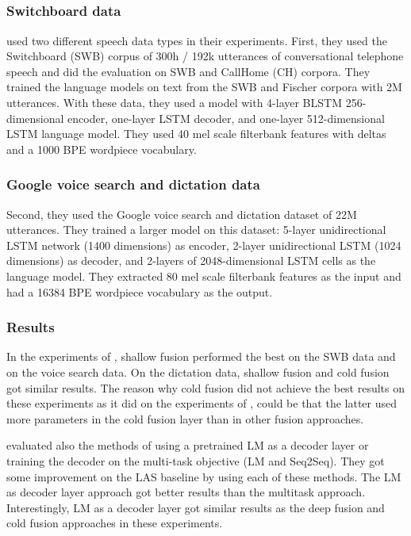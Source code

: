 \documentclass[11pt]{article}
\begin{document}
\subsection{\citet{toshniwal2018comparison}}
\subsubsection{Switchboard data}
\citet{toshniwal2018comparison} used two different speech data types in their experiments. First, they used the Switchboard (SWB) corpus of 300h / 192k utterances of conversational telephone speech and did the evaluation on SWB and CallHome (CH) corpora. They trained the language models on text from the SWB and Fischer corpora with 2M utterances. With these data, they used a model with 4-layer BLSTM 256-dimensional encoder, one-layer LSTM decoder, and one-layer 512-dimensional LSTM language model. They used 40 mel scale filterbank features with deltas and a 1000 BPE wordpiece vocabulary.

\subsubsection{Google voice search and dictation data}
Second, they used the Google voice search and dictation dataset of 22M utterances. They trained a larger model on this dataset: 5-layer unidirectional LSTM network (1400 dimensions) as encoder, 2-layer unidirectional LSTM (1024 dimensions) as decoder, and 2-layers of 2048-dimensional LSTM cells
as the language model. They extracted 80 mel scale filterbank features as the input and had a 16384 BPE wordpiece vocabulary as the output.

\subsubsection{Results}

In the experiments of \citet{toshniwal2018comparison}, shallow fusion performed the best on the SWB data and on the voice search data. On the dictation data, shallow fusion and cold fusion got similar results. The reason why cold fusion did not achieve the best results on these experiments as it did on the experiments of \citet{sriram2017cold}, could be that the latter used more parameters in the cold fusion layer than in other fusion approaches.

\citet{toshniwal2018comparison} evaluated also the methods of using a pretrained LM as a decoder layer or training the decoder on  the multi-task objective (LM and Seq2Seq). They got some improvement on the LAS baseline by using each of these methods. The LM as decoder layer approach got better results than the multitask approach. Interestingly, LM as a decoder layer got similar results as the deep fusion and cold fusion approaches in these experiments.
\end{document}

